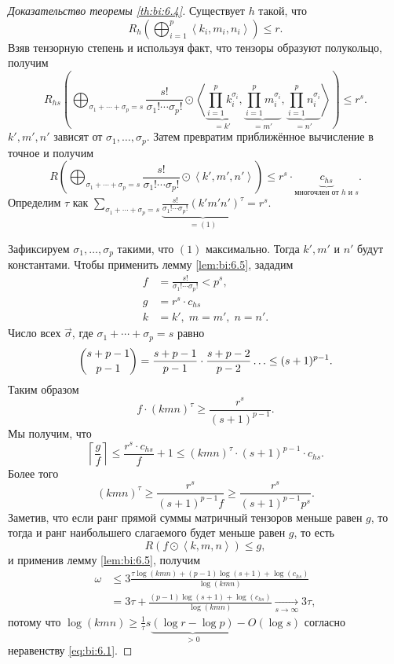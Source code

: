 \begin{proof}[Доказательство теоремы \ref{th:bi:6.4}]
	Существует $h$ такой, что
	\[
		R_h (\bigoplus_{i=1}^p \left\langle k_i, m_i, n_i \right\rangle) \leq r.
	\]
	Взяв тензорную степень и используя факт, что тензоры образуют полукольцо, получим
	\[
		R_{hs} \left( \bigoplus_{\sigma_1 + \dotsb + \sigma_p = s} \frac{s!}{\sigma_1! \dotsm \sigma_p!} \odot \left\langle \underbrace{\prod_{i=1}^p k_i^{\sigma_i}}_{=k'}, \underbrace{\prod_{i=1}^p m_i^{\sigma_i}}_{=m'}, \underbrace{\prod_{i=1}^p n_i^{\sigma_i}}_{=n'} \right\rangle \right) \leq r^s.
	\]
	$k', m', n'$ зависят от $\sigma_1, \dotsc, \sigma_p$. Затем превратим приближённое вычисление в точное и получим
	\[
		R \left( \bigoplus_{\sigma_1 + \dotsb + \sigma_p = s} \frac{s!}{\sigma_1! \dotsm \sigma_p!} \odot \left\langle k', m', n' \right\rangle \right) \leq r^s \cdot \underbrace{c_{hs}}_{\text{многочлен от } h \text{ и } s}.
	\]
	Определим $\tau$ как $\sum\limits_{\sigma_1 + \dotsb + \sigma_p = s} \underbrace{\frac{s!}{\sigma_1! \dotsm \sigma_p!} (k' m' n')^{\tau}}_{=(1)} = r^s$.
	
	Зафиксируем $\sigma_1, \dotsc, \sigma_p$ такими, что $(1)$ максимально. Тогда $k', m'$ и $n'$ будут константами. Чтобы применить лемму \ref{lem:bi:6.5}, зададим
	\begin{align*}
		f & = \frac{s!}{\sigma_1! \dotsm \sigma_p!} < p^s,\\
		g & = r^s \cdot c_{hs}\\
		k & = k', \; m = m', \; n = n'.   
	\end{align*}
	Число всех $\vec{\sigma}$, где $\sigma_1 + \dotsb + \sigma_p = s$ равно
	\[
		\dbinom{s + p - 1}{p-1} = \frac{s+p-1}{p-1} \cdot \frac{s+p-2}{p-2} \dotso \leq (s+1)^{p-1}.
	\]
	Таким образом
	\[
		f \cdot (kmn)^{\tau} \geq \frac{r^s}{(s+1)^{p-1}}.
	\]
	Мы получим, что
	\[
		\left\lceil \frac{g}{f} \right\rceil \leq \frac{r^s \cdot c_{hs}}{f} + 1 \leq (kmn)^{\tau} \cdot (s+1)^{p-1} \cdot c_{hs}.
	\]
	Более того
	\begin{equation}\label{eq:bi:6.1}
		(kmn)^{\tau} \geq \frac{r^s}{(s+1)^{p-1} f} \geq \frac{r^s}{(s+1)^{p-1} p^s}.
	\end{equation}
	Заметив, что если ранг прямой суммы матричный тензоров меньше равен $g$, то тогда и ранг наибольшего слагаемого будет меньше равен $g$, то есть
	\[
		R(f \odot \left\langle k,m,n \right\rangle) \leq g,
	\]
	и применив лемму \ref{lem:bi:6.5}, получим
	\begin{align*}
		\omega & \leq 3 \frac{\tau \log(kmn) + (p-1) \log(s+1) + \log(c_{hs})}{\log(kmn)}   \\
		& = 3 \tau + \frac{(p-1) \log(s+1) + \log(c_{hs})}{\log(kmn)} \underset{s \to \infty}{\to} 3 \tau,
	\end{align*}
	потому что $\log(kmn) \geq \frac{1}{\tau} s \underbrace{(\log r - \log p)}_{> 0} - O(\log s)$ согласно неравенству \eqref{eq:bi:6.1}.
\end{proof}

